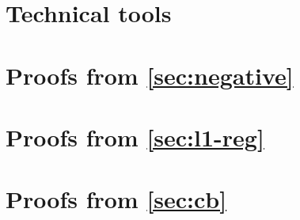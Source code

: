 \documentclass{article}
\newcommand{\arxiv}[1]{\iftoggle{colt}{}{#1}}
\begin{document}
\newpage
\appendix


\section{Technical tools}


\section{Proofs from \cref{sec:negative}}\label{appdx:negative}


\section{Proofs from \cref{sec:l1-reg}}\label{appdx:LG}



\section{Proofs from \cref{sec:cb}}\label{appdx:CB}


\arxiv{
\section{Proofs from \cref{sec:unbounded}}\label{appdx:unbouned}

}
\end{document}
